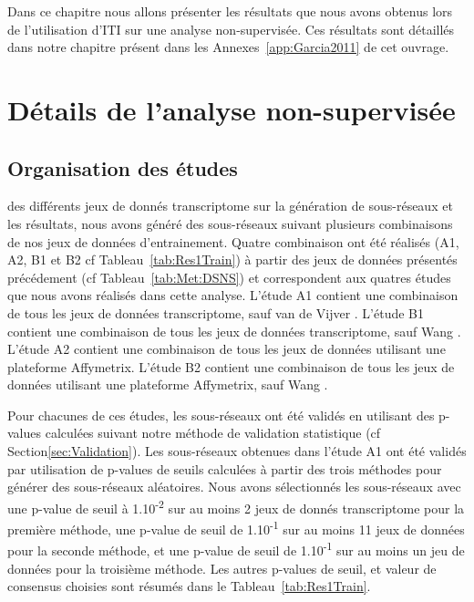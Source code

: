 \singlespacing

\label{chap:results1}
		\begin{center}
			\begin{tcolorbox}[colback=green!5!white,colframe=green!45!black,arc=0mm]
				\sffamily
				Dans ce chapitre nous allons présenter les résultats que nous avons obtenus lors de l'utilisation d'ITI sur une analyse non-supervisée.
				Ces résultats sont détaillés dans notre chapitre \citet{Garcia2011} présent dans les Annexes~\ref{app:Garcia2011} de cet ouvrage.
			\end{tcolorbox}
			\vspace{5ex}
			\minitoc
		\end{center}
		\newpage

\doublespacing

	\section{\textcolor{green!45!black}{Détails de l'analyse non-supervisée}}
		\subsection{\textcolor{green!45!black}{Organisation des études}}
		 des différents jeux de donnés transcriptome sur la génération de sous-réseaux et les résultats, nous avons généré des sous-réseaux suivant plusieurs combinaisons de nos jeux de données d'entrainement.
		Quatre combinaison ont été réalisés (A1, A2, B1 et B2 cf Tableau~\ref{tab:Res1Train}) à partir des jeux de données présentés précédement (cf Tableau~\ref{tab:Met:DSNS}) et correspondent aux quatres études que nous avons réalisés dans cette analyse.
		L'étude A1 contient une combinaison de tous les jeux de données transcriptome, sauf van de Vijver \citet{vandevijver2002}.
		L'étude B1 contient une combinaison de tous les jeux de données transcriptome, sauf Wang \citet{Wang2005}.
		L'étude A2 contient une combinaison de tous les jeux de données utilisant une plateforme Affymetrix.
		L'étude B2 contient une combinaison de tous les jeux de données utilisant une plateforme Affymetrix, sauf Wang \citet{Wang2005}.

		Pour chacunes de ces études, les sous-réseaux ont été validés en utilisant des p-values calculées suivant notre méthode de validation statistique (cf Section\ref{sec:Validation}).
		Les sous-réseaux obtenues dans l'étude A1 ont été validés par utilisation de p-values de seuils calculées à partir des trois méthodes pour générer des sous-réseaux aléatoires.
		Nous avons sélectionnés les sous-réseaux avec une p-value de seuil à 1.10\textsuperscript{-2} sur au moins 2 jeux de donnés transcriptome pour la première méthode, une p-value de seuil de 1.10\textsuperscript{-1} sur au moins 11 jeux de données pour la seconde méthode, et une p-value de seuil de 1.10\textsuperscript{-1} sur au moins un jeu de données pour la troisième méthode.
		Les autres p-values de seuil, et valeur de consensus choisies sont résumés dans le Tableau~\ref{tab:Res1Train}.

